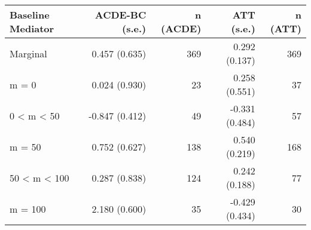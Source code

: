 \begingroup
\fontsize{12.0pt}{14.4pt}\selectfont
\begin{longtable}{lrrrr}
\toprule
Baseline Mediator & ACDE-BC (s.e.) & n (ACDE) & ATT (s.e.) & n (ATT) \\ 
\midrule\addlinespace[2.5pt]
Marginal & 0.457 (0.635) & 369 & 0.292 (0.137) & 369 \\ 
m = 0 & 0.024 (0.930) & 23 & 0.258 (0.551) & 37 \\ 
0 < m < 50 & -0.847 (0.412) & 49 & -0.331 (0.484) & 57 \\ 
m = 50 & 0.752 (0.627) & 138 & 0.540 (0.219) & 168 \\ 
50 < m < 100 & 0.287 (0.838) & 124 & 0.242 (0.188) & 77 \\ 
m = 100 & 2.180 (0.600) & 35 & -0.429 (0.434) & 30 \\ 
\bottomrule
\end{longtable}
\endgroup


